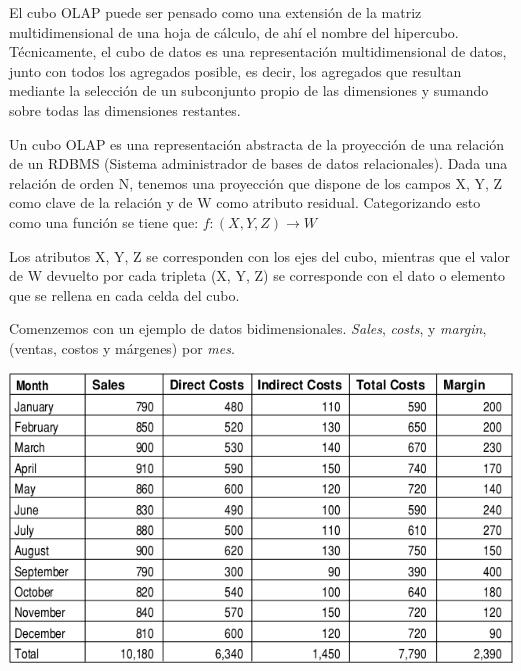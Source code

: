 \documentclass{fancyslides}
\begin{document}
\begin{frame}
\end{frame}

\begin{frame}
\misc
{
El cubo OLAP puede ser pensado como una extensión de la matriz multidimensional de una hoja de cálculo, de ahí el nombre del hipercubo. Técnicamente, el cubo de datos es una representación multidimensional de datos, junto con todos los agregados posible, es decir, los agregados que resultan mediante la selección de un subconjunto propio de las dimensiones y sumando sobre todas las dimensiones restantes.
}
\end{frame}

\begin{frame}
\misc
{
Un cubo OLAP es una representación abstracta de la proyección de una relación de un RDBMS (Sistema administrador de bases de datos relacionales).
Dada una relación de orden N, tenemos una proyección que dispone de los campos X, Y, Z como clave de la relación y de W como atributo residual.
Categorizando esto como una función se tiene que:
$f : (X,Y,Z) \rightarrow  W$

Los atributos X, Y, Z se corresponden con los ejes del cubo, mientras que el valor de W devuelto por cada tripleta (X, Y, Z) se corresponde con el dato o elemento que se rellena en cada celda del cubo.

}
\end{frame}

\begin{frame}
\misc
{
Comenzemos con un ejemplo de datos bidimensionales. \textit{Sales}, \textit{costs}, y \textit{margin}, (ventas, costos y márgenes) por \textit{mes}.
\begin{center}
\includegraphics[scale=0.4]{cube_1}
\end{center}
}
\end{frame}
\end{document}
